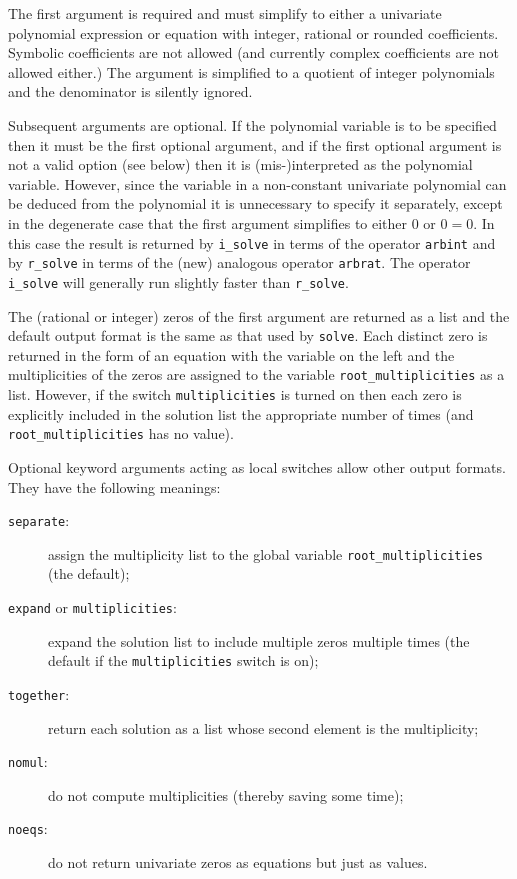 The first argument is required and must simplify to either a
univariate polynomial expression or equation with integer, rational or
rounded coefficients.  Symbolic coefficients are not allowed (and
currently complex coefficients are not allowed either.)  The argument
is simplified to a quotient of integer polynomials and the denominator
is silently ignored.
  
Subsequent arguments are optional.  If the polynomial variable is to
be specified then it must be the first optional argument, and if the
first optional argument is not a valid option (see below) then it is
(mis-)interpreted as the polynomial variable.  However, since the
variable in a non-constant univariate polynomial can be deduced from
the polynomial it is unnecessary to specify it separately, except in
the degenerate case that the first argument simplifies to either 0 or
$0 = 0$.  In this case the result is returned by \verb|i_solve| in
terms of the operator \verb|arbint| and by \verb|r_solve| in terms of
the (new) analogous operator \verb|arbrat|.  The operator
\verb|i_solve| will generally run slightly faster than \verb|r_solve|.
  
The (rational or integer) zeros of the first argument are returned as
a list and the default output format is the same as that used by
\verb|solve|.  Each distinct zero is returned in the form of an
equation with the variable on the left and the multiplicities of the
zeros are assigned to the variable \verb|root_multiplicities| as a
list.  However, if the switch \verb|multiplicities| is turned on then
each zero is explicitly included in the solution list the appropriate
number of times (and \verb|root_multiplicities| has no value).
  
\begin{sloppypar}
Optional keyword arguments acting as local switches allow other output
formats.  They have the following meanings:
\begin{description}
\item[\verb|separate|:] assign the multiplicity list to the global
  variable \verb|root_multiplicities| (the default);
\item[\verb|expand| or \verb|multiplicities|:] expand the solution
  list to include multiple zeros multiple times (the default if the
  \verb|multiplicities| switch is on);
\item[\verb|together|:] return each solution as a list whose second
  element is the multiplicity;
\item[\verb|nomul|:] do not compute multiplicities (thereby saving
  some time);
\item[\verb|noeqs|:] do not return univariate zeros as equations but
  just as values.
\end{description}
\end{sloppypar}


